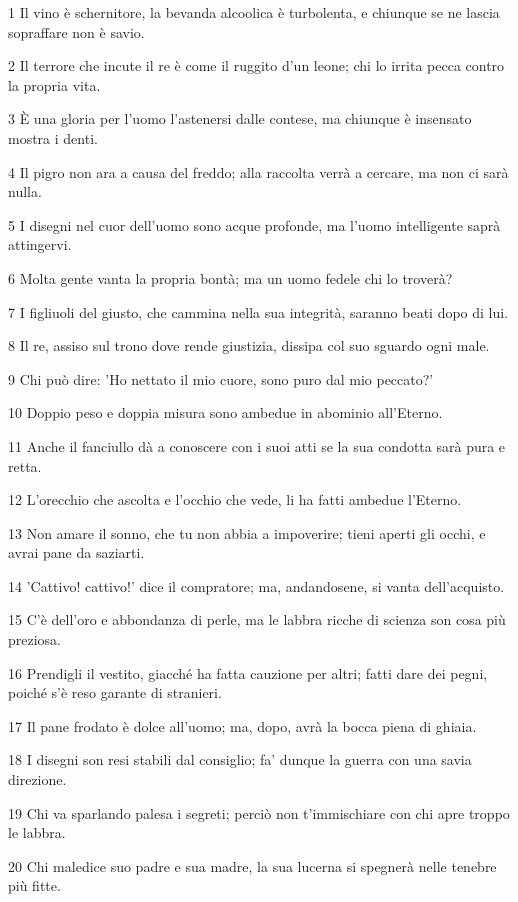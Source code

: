 \par 1 Il vino è schernitore, la bevanda alcoolica è turbolenta, e chiunque se ne lascia sopraffare non è savio.
\par 2 Il terrore che incute il re è come il ruggito d'un leone; chi lo irrita pecca contro la propria vita.
\par 3 È una gloria per l'uomo l'astenersi dalle contese, ma chiunque è insensato mostra i denti.
\par 4 Il pigro non ara a causa del freddo; alla raccolta verrà a cercare, ma non ci sarà nulla.
\par 5 I disegni nel cuor dell'uomo sono acque profonde, ma l'uomo intelligente saprà attingervi.
\par 6 Molta gente vanta la propria bontà; ma un uomo fedele chi lo troverà?
\par 7 I figliuoli del giusto, che cammina nella sua integrità, saranno beati dopo di lui.
\par 8 Il re, assiso sul trono dove rende giustizia, dissipa col suo sguardo ogni male.
\par 9 Chi può dire: 'Ho nettato il mio cuore, sono puro dal mio peccato?'
\par 10 Doppio peso e doppia misura sono ambedue in abominio all'Eterno.
\par 11 Anche il fanciullo dà a conoscere con i suoi atti se la sua condotta sarà pura e retta.
\par 12 L'orecchio che ascolta e l'occhio che vede, li ha fatti ambedue l'Eterno.
\par 13 Non amare il sonno, che tu non abbia a impoverire; tieni aperti gli occhi, e avrai pane da saziarti.
\par 14 'Cattivo! cattivo!' dice il compratore; ma, andandosene, si vanta dell'acquisto.
\par 15 C'è dell'oro e abbondanza di perle, ma le labbra ricche di scienza son cosa più preziosa.
\par 16 Prendigli il vestito, giacché ha fatta cauzione per altri; fatti dare dei pegni, poiché s'è reso garante di stranieri.
\par 17 Il pane frodato è dolce all'uomo; ma, dopo, avrà la bocca piena di ghiaia.
\par 18 I disegni son resi stabili dal consiglio; fa' dunque la guerra con una savia direzione.
\par 19 Chi va sparlando palesa i segreti; perciò non t'immischiare con chi apre troppo le labbra.
\par 20 Chi maledice suo padre e sua madre, la sua lucerna si spegnerà nelle tenebre più fitte.
